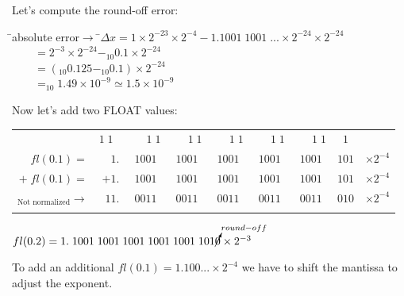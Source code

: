 \documentclass[a4paper,12pt,]{report}
\begin{document}
	Let's compute the round-off error:

\begin{tabbing}
	\hspace*{2cm}\=\footnotesize{absolute error$\rightarrow$} \hspace*{0.25cm}\=$\Delta x
		=1\times2^{-23}\times2^{-4}-1.1001\;1001\;...\times2^{-24}\times2^{-24}$\\
	\>\> $\qquad \! \!= 2^{-3}\times2^{-24}-_{10}0.1\times2^{-24}$\\
	\>\> $\qquad \! \!= (_{10}0.125-_{10}0.1)\times2^{-24}$\\
	\>\> $\qquad \! \!=_{10}\!1.49\times10^{-9}\simeq1.5\times10^{-9}$\\

\end{tabbing}

	Now let's add two FLOAT values:

\begin{center}
	\begin{tabular}{rrccccccr}
		& \tiny{$1\;1\;\;$} &  \tiny{$\quad\, \;1\;1$} & \tiny{$\quad\, \;1\;1$} 
			& \tiny{$\quad\, \;1\;1$} & \tiny{$\quad\, \;1\;1$} & \tiny{$\quad\, \;1\;1$} 
			& \tiny{$1$} & \\
		$fl(0.1)=$ & $1.$ & $\!1001$ & $1001$ & $1001$ & $1001$ & $1001$ & $101$ 
			& $\times2^{-4}$\\
		$+\;fl(0.1)=$ & $+1.$ & $\!1001$ & $1001$ & $1001$ & $1001$ & $1001$ & $101$ 
			& $\times2^{-4}$\\
		\hline
		$_{\text{Not normalized}}\rightarrow$& $11.$ & $\!0011$ & $0011$ & $0011$ & $0011$ 
			& $0011$ & $010$ & $\times2^{-4}$\\ \\
	\end{tabular}

	$fl(0.2) = 1.\;1001\;1001\;1001\;1001\;1001\;101\cancelto{round-off}{0} \times2^{-3}$
\end{center}

	To add an additional $fl(0.1)=1.100...\times2^{-4}$ we have to shift the mantissa to adjust the 
	exponent.
\end{document}
